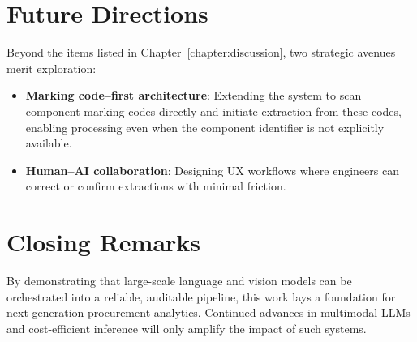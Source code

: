 \section{Future Directions}
Beyond the items listed in Chapter~\ref{chapter:discussion}, two strategic avenues merit exploration:
\begin{itemize}
  \item \textbf{Marking code–first architecture}: Extending the system to scan component marking codes directly and initiate extraction from these codes, enabling processing even when the component identifier is not explicitly available.
  \item \textbf{Human–AI collaboration}: Designing UX workflows where engineers can correct or confirm extractions with minimal friction.
\end{itemize}

\section{Closing Remarks}
By demonstrating that large-scale language and vision models can be orchestrated into a reliable, auditable pipeline, this work lays a foundation for next-generation procurement analytics.  Continued advances in multimodal LLMs and cost-efficient inference will only amplify the impact of such systems.